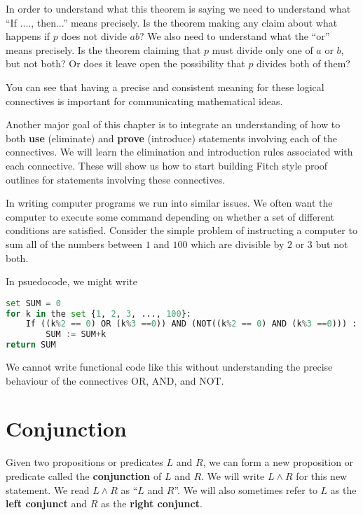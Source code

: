 In order to understand what this theorem is saying we need to understand what ``If ...., then...'' means precisely.  Is the theorem making any claim about what happens if $p$ does not divide $ab$?  We also need to understand what the ``or'' means precisely.  Is the theorem claiming that $p$ must divide only one of $a$ or $b$, but not both?  Or does it leave open the possibility that $p$ divides both of them?

You can see that having a precise and consistent meaning for these logical connectives is important for communicating mathematical ideas. 

Another major goal of this chapter is to integrate an understanding of how to both \textbf{use} (eliminate) and \textbf{prove} (introduce) statements involving each of the connectives.  We will learn the elimination and introduction rules associated with each connective.  These will show us how to start building Fitch style proof outlines for statements involving these connectives.

In writing computer programs we run into similar issues.  We often want the computer to execute some command depending on whether a set of different conditions are satisfied.  Consider the simple problem of instructing a computer to sum all of the numbers between $1$ and $100$ which are divisible by $2$ or $3$ but not both.

In psuedocode, we might write

\begin{lstlisting}[language=Python]
set SUM = 0
for k in the set {1, 2, 3, ..., 100}:
	If ((k%2 == 0) OR (k%3 ==0)) AND (NOT((k%2 == 0) AND (k%3 ==0))) :
		SUM := SUM+k 
return SUM
\end{lstlisting}

We cannot write functional code like this without understanding the precise behaviour of the connectives OR, AND, and NOT.



\section{Conjunction}

Given two propositions or predicates $L$ and $R$, we can form a new proposition or predicate called the \textbf{conjunction} of $L$ and $R$.  We will write $L \wedge R$ for this new statement.  We read $L \wedge R$ as ``$L$ and $R$''.  We will also sometimes refer to $L$ as the  \textbf{left conjunct} and $R$ as the \textbf{right conjunct}.

